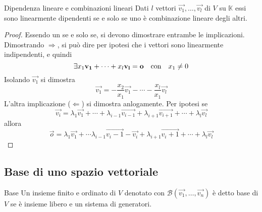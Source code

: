 \begin{Thm}{Dipendenza lineare e combinazioni lineari}
  Dati $l$ vettori $\vec{v_1},\ldots,\vec{v_l}$ di $V$ su $\mathbb{K}$ essi sono
  linearmente dipendenti se e solo se uno è combinazione lineare degli altri.
\end{Thm}

\begin{proof}
  Essendo un se e solo se, si devono dimostrare entrambe le implicazioni. Dimostrando
  $\Rightarrow$, si può dire per ipotesi che i vettori sono linearmente indipendenti, e
  quindi
  \begin{equation*}
    \exists x_1\vec{v_1}+\cdots+x_l\vec{v_l}=\vec{o}\qq{con} x_1\neq0
  \end{equation*}
  Isolando $\vec{v_1}$ si dimostra
  \begin{equation*}
    \vec{v_1}= - \frac{x_2}{x_1}\vec{v_1}-\cdots-\frac{x_l}{x_1}\vec{v_l}
  \end{equation*}
  L'altra implicazione ($\Leftarrow$) si dimostra anlogamente. Per ipotesi se
  \begin{equation*}
    \vec{v_i}=\lambda_1\vec{v_1}+\cdots+\lambda_{i-1}\vec{v_{i-1}}+
    \lambda_{i+1}\vec{v_{i+1}}+\cdots+\lambda_l\vec{v_l}
  \end{equation*}
  allora
  \begin{equation*}
    \vec{o} =
    \lambda_1\vec{v_1}+\cdots\lambda_{i-1}\vec{v_i-1}-\vec{v_i}+\lambda_{i+1}\vec{v_i+1}
    +\cdots+\lambda_l\vec{v_l}
  \end{equation*}
\end{proof}

\subsection{Base di uno spazio vettoriale}%
\label{sub:base_di_uno_spazio_vettoriale}

\begin{Def}{Base}
  Un insieme finito e ordinato di $V$ denotato con
  $\mathscr{B}(\vec{v_1},\ldots,\vec{v_n})$ è detto base di $V$ se è insieme libero e un
  sistema di generatori.
\end{Def}

